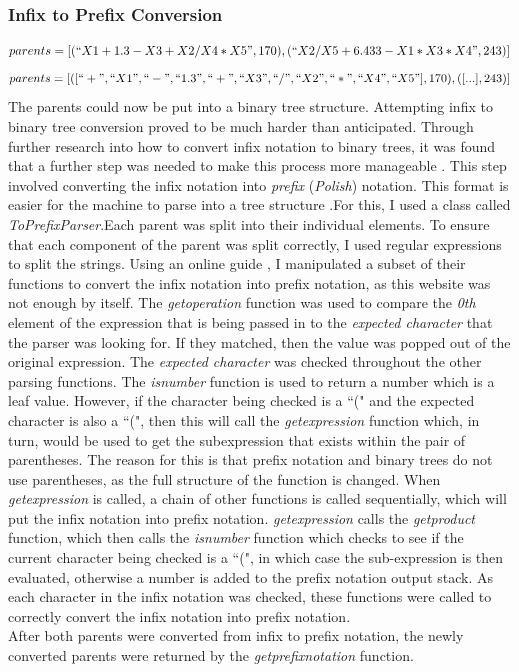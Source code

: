 \documentclass[11pt]{article}
\begin{document}
\subsubsection{Infix to Prefix Conversion}\label{subsubsec:I2P}
\begin{equation}parents = [(``X1+1.3-X3+X2/X4*X5",170),( ``X2/X5+6.433-X1*X3*X4",243)] \end{equation} \begin{equation}parents = [([``+", ``X1", ``-", ``1.3", ``+", ``X3", ``/", ``X2", ``*", ``X4", ``X5"], 170),([...],243)] \end{equation}
The parents could now be put into a binary tree structure. Attempting infix to binary tree conversion proved to be much harder than anticipated. Through further research into how to convert infix notation to binary trees, it was found that a further step was needed to make this process more manageable \cite{ref-pre}. This step involved converting the infix notation into \textit{prefix} (\textit{Polish}) notation. This format is easier for the machine to parse into a tree structure .For this, I used a class called \textit{ToPrefixParser}.Each parent was split into their individual elements. To ensure that each component of the parent was split correctly, I used regular expressions to split the strings.
Using an online guide \cite{ref-pre}, I manipulated a subset of their functions to convert the infix notation into prefix notation, as this website was not enough by itself. The \textit{get\textunderscore operation}  function was used to compare the \textit{0th} element of the expression that is being passed in to the \textit{expected character} that the parser was looking for. If they matched, then the value was popped out of the original expression. The \textit{expected character} was checked throughout the other parsing functions. The \textit{is\textunderscore number} function is used to return a number which is a leaf value. 
However, if the character being checked is a ``(" and the expected character is also a ``(", then this will call the \textit{get\textunderscore expression} function which, in turn, would be used to get the subexpression that exists within the pair of parentheses. The reason for this is that prefix notation and binary trees do not use parentheses, as the full structure of the function is changed. When \textit{get\textunderscore expression} is called,  a chain of other functions is called sequentially, which will put the infix notation into prefix notation.
\textit{get\textunderscore expression} calls the \textit{get\textunderscore product} function, which then calls the \textit{is\textunderscore number} function which checks to see if the current character being checked is a ``(", in which case the sub-expression is then evaluated, otherwise a number is added to the prefix notation output stack.  As each character in the infix notation was checked, these functions were called to correctly convert the infix notation into prefix notation. \\ 
After both parents were converted from infix to prefix notation, the newly converted parents were returned by the \textit{get\textunderscore prefix\textunderscore notation} function.  
\end{document}
